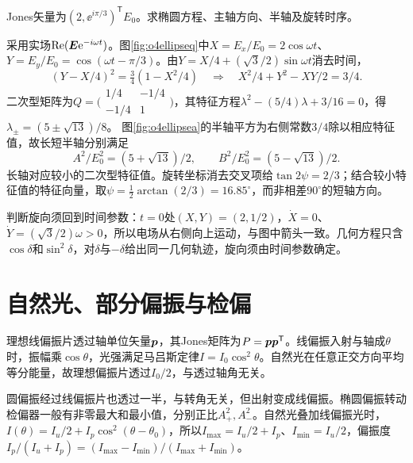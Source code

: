 \begin{example}\label{ex:o4ellipse}
Jones矢量为$(2,\ee^{i\pi/3})^{\mathsf T}E_0$。求椭圆方程、主轴方向、半轴及旋转时序。
\end{example}
\begin{solution}
采用实场$\operatorname{Re}(\bm{E}\mathrm e^{-i\omega t})$。图\ref{fig:o4ellipseq}中$X=E_x/E_0=2\cos\omega t$、$Y=E_y/E_0=\cos(\omega t-\pi/3)$。由$Y=X/4+(\sqrt3/2)\sin\omega t$消去时间，
\[
 (Y-X/4)^2=\tfrac34(1-X^2/4)
 \quad\Longrightarrow\quad X^2/4+Y^2-XY/2=3/4.
\]
二次型矩阵为$Q=\bigl(\begin{smallmatrix}1/4&-1/4\\-1/4&1\end{smallmatrix}\bigr)$，其特征方程$\lambda^2-(5/4)\lambda+3/16=0$，得$\lambda_\pm=(5\pm\sqrt{13})/8$。
图\ref{fig:o4ellipsea}的半轴平方为右侧常数$3/4$除以相应特征值，故长短半轴分别满足
\[
 A^2/E_0^2=(5+\sqrt{13})/2,\qquad
 B^2/E_0^2=(5-\sqrt{13})/2.
\]
长轴对应较小的二次型特征值。旋转坐标消去交叉项给$\tan2\psi=2/3$；结合较小特征值的特征向量，取$\psi=\tfrac12\arctan(2/3)=16.85^\circ$，而非相差$90^\circ$的短轴方向。

判断旋向须回到时间参数：$t=0$处$(X,Y)=(2,1/2)$，$\dot X=0$、$\dot Y=(\sqrt3/2)\omega>0$，所以电场从右侧向上运动，与图中箭头一致。几何方程只含$\cos\delta$和$\sin^2\delta$，对$\delta$与$-\delta$给出同一几何轨迹，旋向须由时间参数确定。
\end{solution}

\section{自然光、部分偏振与检偏}\label{th:o4partial}
理想线偏振片透过轴单位矢量$\bm{p}$，其Jones矩阵为$P=\bm{p}\bm{p}^{\mathsf T}$。线偏振入射与轴成$\theta$时，振幅乘$\cos\theta$，光强满足马吕斯定律$I=I_0\cos^2\theta$。自然光在任意正交方向平均等分能量，故理想偏振片透过$I_0/2$，与透过轴角无关。

圆偏振经过线偏振片也透过一半，与转角无关，但出射变成线偏振。椭圆偏振转动检偏器一般有非零最大和最小值，分别正比$A_+^2,A_-^2$。自然光叠加线偏振光时，$I(\theta)=I_u/2+I_p\cos^2(\theta-\theta_0)$，所以$I_{\max}=I_u/2+I_p$、$I_{\min}=I_u/2$，偏振度$I_p/(I_u+I_p)=(I_{\max}-I_{\min})/(I_{\max}+I_{\min})$。

